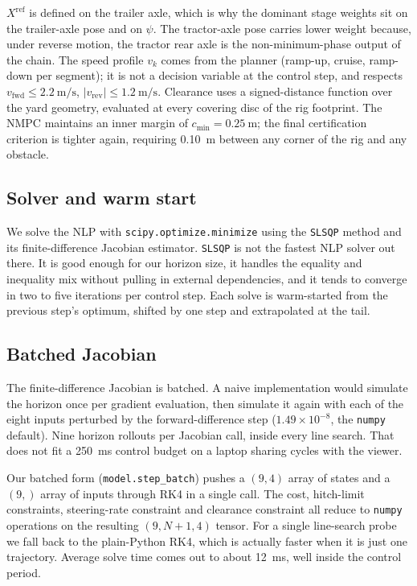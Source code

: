 \documentclass[conference]{IEEEtran}
\begin{document}
$X^{\mathrm{ref}}$ is defined on the trailer axle, which is why the
dominant stage weights sit on the trailer-axle pose and on $\psi$. The
tractor-axle pose carries lower weight because, under reverse motion,
the tractor rear axle is the non-minimum-phase output of the chain.
The speed profile $v_k$ comes from the planner (ramp-up, cruise,
ramp-down per segment); it is not a decision variable at the control
step, and respects $v_{\mathrm{fwd}} \le \SI{2.2}{\meter\per\second}$,
$|v_{\mathrm{rev}}| \le \SI{1.2}{\meter\per\second}$. Clearance uses a
signed-distance function over the yard geometry, evaluated at every
covering disc of the rig footprint. The NMPC maintains an inner margin
of $c_{\min} = \SI{0.25}{\meter}$; the final certification criterion is
tighter again, requiring \SI{0.10}{\meter} between any corner of the
rig and any obstacle.

\subsection{Solver and warm start}

We solve the NLP with \texttt{scipy.optimize.minimize} using the
\texttt{SLSQP} method and its finite-difference Jacobian estimator.
\texttt{SLSQP} is not the fastest NLP solver out there. It is good
enough for our horizon size, it handles the equality and inequality mix
without pulling in external dependencies, and it tends to converge in
two to five iterations per control step. Each solve is warm-started from
the previous step's optimum, shifted by one step and extrapolated at the
tail.

\subsection{Batched Jacobian}

The finite-difference Jacobian is batched. A naive implementation would
simulate the horizon once per gradient evaluation, then simulate it
again with each of the eight inputs perturbed by the forward-difference
step ($1.49 \times 10^{-8}$, the \texttt{numpy} default). Nine horizon
rollouts per Jacobian call, inside every line search. That does not fit
a \SI{250}{\milli\second} control budget on a laptop sharing cycles with
the viewer.

Our batched form (\texttt{model.step\_batch}) pushes a $(9, 4)$ array of
states and a $(9,)$ array of inputs through RK4 in a single call. The
cost, hitch-limit constraints, steering-rate constraint and clearance
constraint all reduce to \texttt{numpy} operations on the resulting
$(9, N+1, 4)$ tensor. For a single line-search probe we fall back to the
plain-Python RK4, which is actually faster when it is just one
trajectory. Average solve time comes out to about \SI{12}{\milli\second},
well inside the control period.
\end{document}
